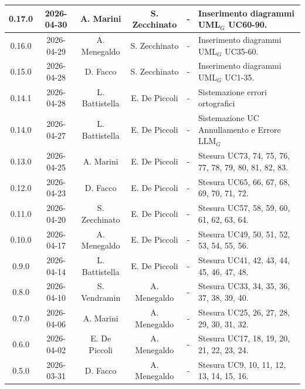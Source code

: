 \documentclass[a4paper, 10pt]{article}
\begin{document}
\begin{longtable}{|c|c|c|c|c|p{3cm}|}
    0.17.0 & 2026-04-30 & A. Marini & S. Zecchinato & - & Inserimento diagrammi UML$_G$ UC60-90. \\ \hline

    0.16.0 & 2026-04-29 & A. Menegaldo & S. Zecchinato & - & Inserimento diagrammi UML$_G$ UC35-60. \\ \hline

    0.15.0 & 2026-04-28 & D. Facco & S. Zecchinato & - & Inserimento diagrammi UML$_G$ UC1-35. \\ \hline

    0.14.1 & 2026-04-28 & L. Battistella & E. De Piccoli & - & Sistemazione errori ortografici \\ \hline

    0.14.0 & 2026-04-27 & L. Battistella & E. De Piccoli & - & Sistemazione UC Annullamento e Errore LLM$_G$ \\ \hline

    0.13.0 & 2026-04-25 & A. Marini & E. De Piccoli & - & Stesura UC73, 74, 75, 76, 77, 78, 79, 80, 81, 82, 83. \\ \hline

    0.12.0 & 2026-04-23 & D. Facco & E. De Piccoli & - & Stesura UC65, 66, 67, 68, 69, 70, 71, 72. \\ \hline

    0.11.0 & 2026-04-20 & S. Zecchinato & E. De Piccoli & - & Stesura UC57, 58, 59, 60, 61, 62, 63, 64. \\ \hline

    0.10.0 & 2026-04-17 & A. Menegaldo & E. De Piccoli & - & Stesura UC49, 50, 51, 52, 53, 54, 55, 56. \\ \hline

    0.9.0 & 2026-04-14 & L. Battistella & E. De Piccoli & - & Stesura UC41, 42, 43, 44, 45, 46, 47, 48. \\ \hline

    0.8.0 & 2026-04-10 & S. Vendramin & A. Menegaldo & - & Stesura UC33, 34, 35, 36, 37, 38, 39, 40. \\ \hline

    0.7.0 & 2026-04-06 & A. Marini & A. Menegaldo & - & Stesura UC25, 26, 27, 28, 29, 30, 31, 32. \\ \hline

    0.6.0 & 2026-04-02 & E. De Piccoli & A. Menegaldo & - & Stesura UC17, 18, 19, 20, 21, 22, 23, 24. \\ \hline

    0.5.0 & 2026-03-31 & D. Facco & A. Menegaldo & - & Stesura UC9, 10, 11, 12, 13, 14, 15, 16. \\ \hline


\end{longtable}
\end{document}
